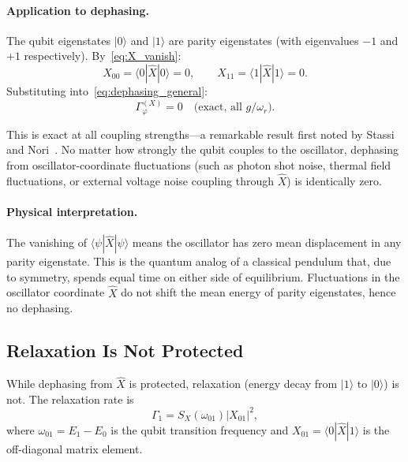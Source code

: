 \documentclass[reprint, floatfix, superscriptaddress, amsmath, amssymb, longbibliography]{revtex4-2}
\begin{document}
\paragraph{Application to dephasing.} The qubit eigenstates $|0\rangle$ and $|1\rangle$ are parity eigenstates (with eigenvalues $-1$ and $+1$ respectively). By~\eqref{eq:X_vanish}:
\begin{equation}
X_{00} = \langle 0|\hat{X}|0\rangle = 0, \qquad X_{11} = \langle 1|\hat{X}|1\rangle = 0.
\label{eq:X_diag_zero}
\end{equation}
Substituting into~\eqref{eq:dephasing_general}:
\begin{equation}
\boxed{\Gamma_\varphi^{(X)} = 0 \quad \text{(exact, all } g/\omega_r).}
\label{eq:dephasing_zero}
\end{equation}

This is exact at all coupling strengths---a remarkable result first noted by Stassi and Nori~\cite{Stassi2018}. No matter how strongly the qubit couples to the oscillator, dephasing from oscillator-coordinate fluctuations (such as photon shot noise, thermal field fluctuations, or external voltage noise coupling through $\hat{X}$) is identically zero.

\paragraph{Physical interpretation.} The vanishing of $\langle\psi|\hat{X}|\psi\rangle$ means the oscillator has zero mean displacement in any parity eigenstate. This is the quantum analog of a classical pendulum that, due to symmetry, spends equal time on either side of equilibrium. Fluctuations in the oscillator coordinate $\hat{X}$ do not shift the mean energy of parity eigenstates, hence no dephasing.

\subsection{Relaxation Is Not Protected}
\label{sec:relaxation_not_protected}

While dephasing from $\hat{X}$ is protected, relaxation (energy decay from $|1\rangle$ to $|0\rangle$) is not. The relaxation rate is
\begin{equation}
\Gamma_1 = S_X(\omega_{01})|X_{01}|^2,
\label{eq:relaxation_X}
\end{equation}
where $\omega_{01} = E_1 - E_0$ is the qubit transition frequency and $X_{01} = \langle 0|\hat{X}|1\rangle$ is the off-diagonal matrix element.
\end{document}
